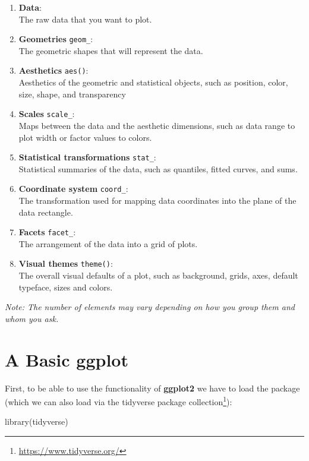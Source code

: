 \documentclass[
]{krantz}
\makeatletter
\newenvironment{Shaded}{\begin{snugshade}}{\end{snugshade}}
\newcommand{\FunctionTok}[1]{\textcolor[rgb]{0,0,0}{#1}}
\newcommand{\NormalTok}[1]{#1}
\providecommand{\tightlist}{%
  \setlength{\itemsep}{0pt}\setlength{\parskip}{0pt}}
\renewcommand{\href}[2]{#2\footnote{\url{#1}}}
\newenvironment{kframe}{%
\medskip{}
\setlength{\fboxsep}{.8em}
 \def\at@end@of@kframe{}%
 \ifinner\ifhmode%
  \def\at@end@of@kframe{\end{minipage}}%
  \begin{minipage}{\columnwidth}%
 \fi\fi%
 \def\FrameCommand##1{\hskip\@totalleftmargin \hskip-\fboxsep
 \colorbox{shadecolor}{##1}\hskip-\fboxsep
     \hskip-\linewidth \hskip-\@totalleftmargin \hskip\columnwidth}%
 \MakeFramed {\advance\hsize-\width
   \@totalleftmargin\z@ \linewidth\hsize
   \@setminipage}}%
 {\par\unskip\endMakeFramed%
 \at@end@of@kframe}
\renewenvironment{Shaded}{\begin{kframe}}{\end{kframe}}
\makeatother
\begin{document}
\begin{enumerate}
\def\labelenumi{\arabic{enumi}.}
\tightlist
\item
  \textbf{Data}:\\
  The raw data that you want to plot.
\item
  \textbf{Geometries} \texttt{geom\_}:\\
  The geometric shapes that will represent the data.
\item
  \textbf{Aesthetics} \texttt{aes()}:\\
  Aesthetics of the geometric and statistical objects, such as position, color, size, shape, and transparency
\item
  \textbf{Scales} \texttt{scale\_}:\\
  Maps between the data and the aesthetic dimensions, such as data range to plot width or factor values to colors.
\item
  \textbf{Statistical transformations} \texttt{stat\_}:\\
  Statistical summaries of the data, such as quantiles, fitted curves, and sums.
\item
  \textbf{Coordinate system} \texttt{coord\_}:\\
  The transformation used for mapping data coordinates into the plane of the data rectangle.
\item
  \textbf{Facets} \texttt{facet\_}:\\
  The arrangement of the data into a grid of plots.
\item
  \textbf{Visual themes} \texttt{theme()}:\\
  The overall visual defaults of a plot, such as background, grids, axes, default typeface, sizes and colors.
\end{enumerate}

\emph{Note: The number of elements may vary depending on how you group them and whom you ask.}

\hypertarget{default}{%
\section{A Basic ggplot}\label{default}}

First, to be able to use the functionality of \textbf{ggplot2} we have to load the package (which we can also load via the \href{https://www.tidyverse.org/}{tidyverse package collection}):

\begin{Shaded}
\begin{Highlighting}[]
\FunctionTok{library}\NormalTok{(tidyverse)}
\end{Highlighting}
\end{Shaded}
\end{document}
